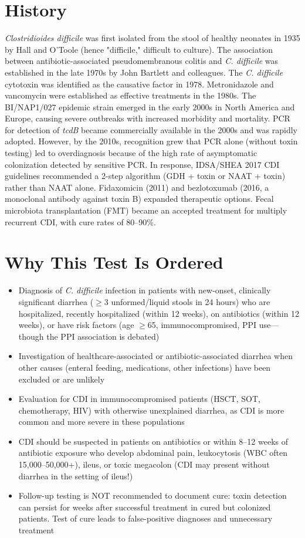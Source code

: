 \section*{History}
\textit{Clostridioides difficile} was first isolated from the stool of healthy neonates in 1935 by Hall and O'Toole (hence "difficile," difficult to culture). The association between antibiotic-associated pseudomembranous colitis and \textit{C. difficile} was established in the late 1970s by John Bartlett and colleagues. The \textit{C. difficile} cytotoxin was identified as the causative factor in 1978. Metronidazole and vancomycin were established as effective treatments in the 1980s. The BI/NAP1/027 epidemic strain emerged in the early 2000s in North America and Europe, causing severe outbreaks with increased morbidity and mortality. PCR for detection of \textit{tcdB} became commercially available in the 2000s and was rapidly adopted. However, by the 2010s, recognition grew that PCR alone (without toxin testing) led to overdiagnosis because of the high rate of asymptomatic colonization detected by sensitive PCR. In response, IDSA/SHEA 2017 CDI guidelines recommended a 2-step algorithm (GDH + toxin or NAAT + toxin) rather than NAAT alone. Fidaxomicin (2011) and bezlotoxumab (2016, a monoclonal antibody against toxin B) expanded therapeutic options. Fecal microbiota transplantation (FMT) became an accepted treatment for multiply recurrent CDI, with cure rates of 80--90\%.

\section*{Why This Test Is Ordered}
\begin{itemize}
  \item Diagnosis of \textit{C. difficile} infection in patients with new-onset, clinically significant diarrhea ($\geq$3 unformed/liquid stools in 24 hours) who are hospitalized, recently hospitalized (within 12 weeks), on antibiotics (within 12 weeks), or have risk factors (age $\geq$65, immunocompromised, PPI use---though the PPI association is debated)
  \item Investigation of healthcare-associated or antibiotic-associated diarrhea when other causes (enteral feeding, medications, other infections) have been excluded or are unlikely
  \item Evaluation for CDI in immunocompromised patients (HSCT, SOT, chemotherapy, HIV) with otherwise unexplained diarrhea, as CDI is more common and more severe in these populations
  \item CDI should be suspected in patients on antibiotics or within 8--12 weeks of antibiotic exposure who develop abdominal pain, leukocytosis (WBC often 15,000--50,000+), ileus, or toxic megacolon (CDI may present without diarrhea in the setting of ileus!)
  \item Follow-up testing is NOT recommended to document cure: toxin detection can persist for weeks after successful treatment in cured but colonized patients. Test of cure leads to false-positive diagnoses and unnecessary treatment
\end{itemize}

